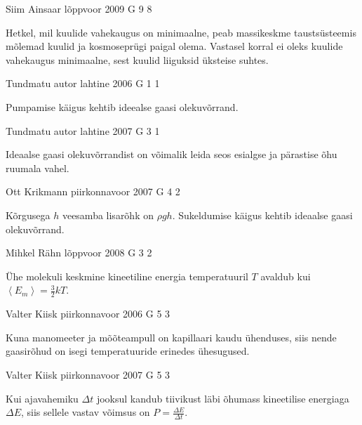 \documentclass[11pt]{article}
\begin{document}
{%
{Siim Ainsaar} %
{lõppvoor} %
{2009} %
{G 9} %
{8} %
{

\ifHint
Hetkel, mil kuulide vahekaugus on minimaalne, peab massikeskme taustsüsteemis mõlemad kuulid ja kosmoseprügi paigal olema. Vastasel korral ei oleks kuulide vahekaugus minimaalne, sest kuulid liiguksid üksteise suhtes.
\fi
}

{Tundmatu autor} %
{lahtine} %
{2006} %
{G 1} %
{1} %
{

\ifHint
Pumpamise käigus kehtib ideealse gaasi olekuvõrrand.
\fi
}

{Tundmatu autor} %
{lahtine} %
{2007} %
{G 3} %
{1} %
{

\ifHint
Ideaalse gaasi olekuvõrrandist on võimalik leida seos esialgse ja pärastise õhu ruumala vahel.
\fi
}

{Ott Krikmann} %
{piirkonnavoor} %
{2007} %
{G 4} %
{2} %
{

\ifHint
Kõrgusega $h$ veesamba lisarõhk on $\rho gh$. Sukeldumise käigus kehtib ideaalse gaasi olekuvõrrand.
\fi
}

{Mihkel Rähn} %
{lõppvoor} %
{2008} %
{G 3} %
{2} %
{

\ifHint
Ühe molekuli keskmine kineetiline energia temperatuuril $T$ avaldub kui $\left\langle E_{m}\right\rangle=\frac{3}{2} k T$.
\fi
}

{Valter Kiisk} %
{piirkonnavoor} %
{2006} %
{G 5} %
{3} %
{

\ifHint
Kuna manomeeter ja mõõteampull on kapillaari kaudu ühenduses, siis nende gaasirõhud on isegi temperatuuride erinedes ühesugused.
\fi
}

{Valter Kiisk} %
{piirkonnavoor} %
{2007} %
{G 5} %
{3} %
{

\ifHint
Kui ajavahemiku $\Delta t$ jooksul kandub tiivikust läbi õhumass kineetilise energiaga $\Delta E$, siis sellele vastav võimsus on $P = \frac{\Delta E}{\Delta t}$.
\fi
}

}
\end{document}
